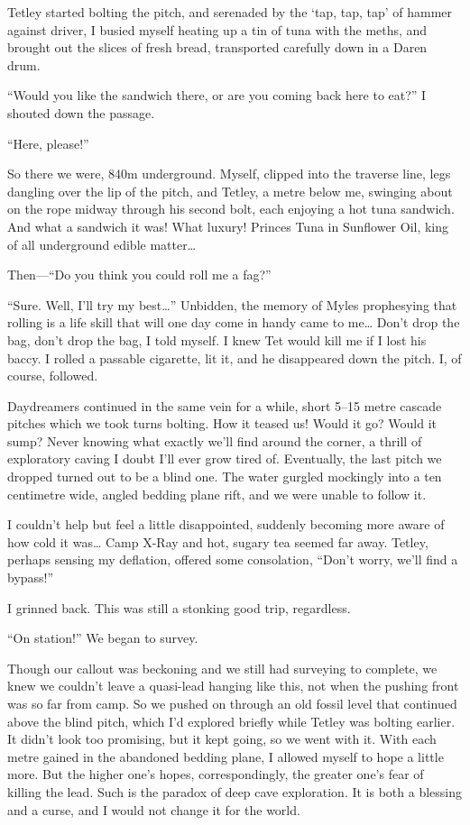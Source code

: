 Tetley started bolting the pitch, and serenaded by the `tap, tap, tap'
of hammer against driver, I busied myself heating up a tin of tuna with
the meths, and brought out the slices of fresh bread, transported
carefully down in a Daren drum.

``Would you like the sandwich there, or are you coming back here to
eat?'' I shouted down the passage.

``Here, please!''

So there we were, 840m underground. Myself, clipped into the traverse
line, legs dangling over the lip of the pitch, and Tetley, a metre below
me, swinging about on the rope midway through his second bolt, each
enjoying a hot tuna sandwich. And what a sandwich it was! What luxury!
Princes Tuna in Sunflower Oil, king of all underground edible
matter\ldots{}

Then---``Do you think you could roll me a fag?''

``Sure. Well, I'll try my best\ldots{}'' Unbidden, the memory of Myles
prophesying that rolling is a life skill that will one day come in handy
came to me\ldots{} Don't drop the bag, don't drop the bag, I told
myself. I knew Tet would kill me if I lost his baccy. I rolled a
passable cigarette, lit it, and he disappeared down the pitch. I, of
course, followed.

Daydreamers continued in the same vein for a while, short 5--15 metre
cascade pitches which we took turns bolting. How it teased us! Would it
go? Would it sump? Never knowing what exactly we'll find around the
corner, a thrill of exploratory caving I doubt I'll ever grow tired of.
Eventually, the last pitch we dropped turned out to be a blind one. The
water gurgled mockingly into a ten centimetre wide, angled bedding plane
rift, and we were unable to follow it.

I couldn't help but feel a little disappointed, suddenly becoming more
aware of how cold it was\ldots{} Camp X-Ray and hot, sugary tea seemed
far away. Tetley, perhaps sensing my deflation, offered some
consolation, ``Don't worry, we'll find a bypass!''

I grinned back. This was still a stonking good trip, regardless.

``On station!'' We began to survey.

Though our callout was beckoning and we still had surveying to complete,
we knew we couldn't leave a quasi-lead hanging like this, not when the
pushing front was so far from camp. So we pushed on through an old
fossil level that continued above the blind pitch, which I'd explored
briefly while Tetley was bolting earlier. It didn't look too promising,
but it kept going, so we went with it. With each metre gained in the
abandoned bedding plane, I allowed myself to hope a little more. But the
higher one's hopes, correspondingly, the greater one's fear of killing
the lead. Such is the paradox of deep cave exploration. It is both a
blessing and a curse, and I would not change it for the world.

